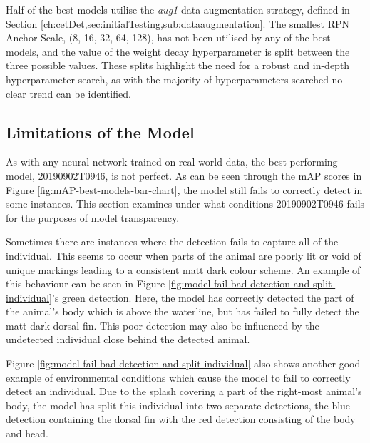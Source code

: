 Half of the best models utilise the \textit{aug1} data augmentation strategy, defined in Section \ref{ch:cetDet,sec:initialTesting,sub:dataaugmentation}. The smallest RPN Anchor Scale, (8, 16, 32, 64, 128), has not been utilised by any of the best models, and the value of the weight decay hyperparameter is split between the three possible values. These splits highlight the need for a robust and in-depth hyperparameter search, as with the majority of hyperparameters searched no clear trend can be identified.

\subsection{Limitations of the Model}\label{ch:cetDet,sec:ModelSelection,sub:LimitationsOfBest}

As with any neural network trained on real world data, the best performing model, 20190902T0946, is not perfect. As can be seen through the mAP scores in Figure \ref{fig:mAP-best-models-bar-chart}, the model still fails to correctly detect in some instances. This section examines under what conditions 20190902T0946 fails for the purposes of model transparency. 

Sometimes there are instances where the detection fails to capture all of the individual. This seems to occur when parts of the animal are poorly lit or void of unique markings leading to a consistent matt dark colour scheme. An example of this behaviour can be seen in Figure \ref{fig:model-fail-bad-detection-and-split-individual}'s green detection. Here, the model has correctly detected the part of the animal's body which is above the waterline, but has failed to fully detect the matt dark dorsal fin. This poor detection may also be influenced by the undetected individual close behind the detected animal. 

Figure \ref{fig:model-fail-bad-detection-and-split-individual} also shows another good example of environmental conditions which cause the model to fail to correctly detect an individual. Due to the splash covering a part of the right-most animal's body, the model has split this individual into two separate detections, the blue detection containing the dorsal fin with the red detection consisting of the body and head. 

